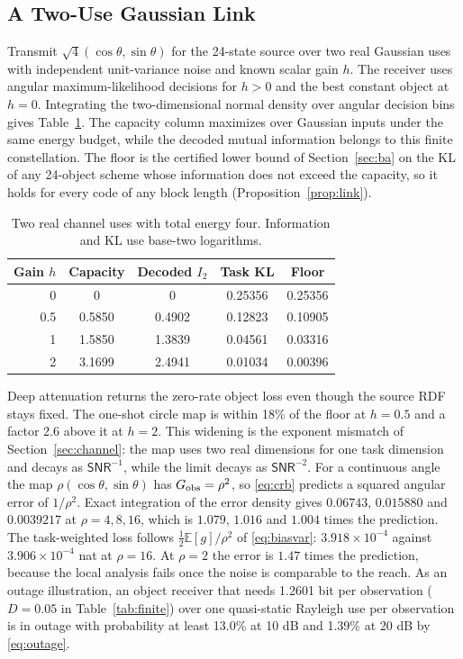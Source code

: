 \documentclass[10pt,journal]{IEEEtran}
\newcommand{\E}{\mathbb E}
\newcommand{\snr}{\mathsf{SNR}}
\begin{document}
\subsection{A Two-Use Gaussian Link}
Transmit $\sqrt{4}(\cos\theta,\sin\theta)$ for the 24-state source over two real Gaussian uses with independent unit-variance noise and known scalar gain $h$. The receiver uses angular maximum-likelihood decisions for $h>0$ and the best constant object at $h=0$. Integrating the two-dimensional normal density over angular decision bins gives Table~\ref{tab:awgn}. The capacity column maximizes over Gaussian inputs under the same energy budget, while the decoded mutual information belongs to this finite constellation. The floor is the certified lower bound of Section~\ref{sec:ba} on the KL of any 24-object scheme whose information does not exceed the capacity, so it holds for every code of any block length (Proposition~\ref{prop:link}).
\begin{table}[t]
\caption{Two real channel uses with total energy four. Information and KL use base-two logarithms.}\label{tab:awgn}\centering
\begin{tabular}{rcccc}\toprule
Gain $h$ & Capacity & Decoded $I_2$ & Task KL & Floor\\\midrule
0 & 0 & 0 & 0.25356 & 0.25356\\
0.5 & 0.5850 & 0.4902 & 0.12823 & 0.10905\\
1 & 1.5850 & 1.3839 & 0.04561 & 0.03316\\
2 & 3.1699 & 2.4941 & 0.01034 & 0.00396\\\bottomrule
\end{tabular}\end{table}
Deep attenuation returns the zero-rate object loss even though the source RDF stays fixed. The one-shot circle map is within 18\% of the floor at $h=0.5$ and a factor 2.6 above it at $h=2$. This widening is the exponent mismatch of Section~\ref{sec:channel}: the map uses two real dimensions for one task dimension and decays as $\snr^{-1}$, while the limit decays as $\snr^{-2}$. For a continuous angle the map $\rho(\cos\theta,\sin\theta)$ has $G_{\rm obs}=\rho^2$, so \eqref{eq:crb} predicts a squared angular error of $1/\rho^2$. Exact integration of the error density gives $0.06743$, $0.015880$ and $0.0039217$ at $\rho=4,8,16$, which is $1.079$, $1.016$ and $1.004$ times the prediction. The task-weighted loss follows $\frac12\E[g]/\rho^2$ of \eqref{eq:biasvar}: $3.918\times10^{-4}$ against $3.906\times10^{-4}$ nat at $\rho=16$. At $\rho=2$ the error is $1.47$ times the prediction, because the local analysis fails once the noise is comparable to the reach. As an outage illustration, an object receiver that needs 1.2601 bit per observation ($D=0.05$ in Table~\ref{tab:finite}) over one quasi-static Rayleigh use per observation is in outage with probability at least 13.0\% at 10 dB and 1.39\% at 20 dB by \eqref{eq:outage}.
\end{document}
